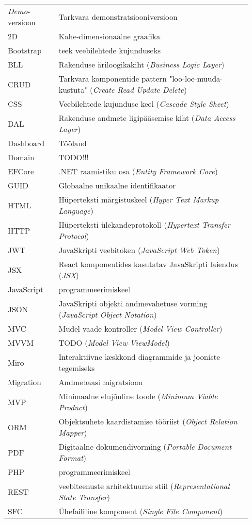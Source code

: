 \begin{longtable}{p{3cm}p{10cm}}
\textit{Demo}-versioon&Tarkvara demonstratsiooniversioon\\
2D&Kahe-dimensionaalne graafika\\
Bootstrap&teek veebilehtede kujunduseks\\
BLL&Rakenduse äriloogikakiht (\emph{Business Logic Layer})\\
CRUD&Tarkvara komponentide pattern "loo-loe-muuda-kustuta" (\emph{Create-Read-Update-Delete})\\
CSS&Veebilehtede kujunduse keel (\emph{Cascade Style Sheet})\\
DAL&Rakenduse andmete ligipääsemise kiht (\emph{Data Access Layer})\\
Dashboard&Töölaud\\
Domain&TODO!!!\\
EFCore&.NET raamistiku osa (\emph{Entity Framework Core})\\
GUID&Globaalne unikaalne identifikaator\\
HTML&Hüperteksti märgistuskeel (\emph{Hyper Text Markup Language})\\
HTTP&Hüperteksti ülekandeprotokoll (\emph{Hypertext Transfer Protocol})\\
JWT&JavaSkripti veebitoken (\emph{JavaScript Web Token})\\
JSX&React komponentides kasutatav JavaSkripti laiendus (\emph{JSX})\\
JavaScript&programmeerimiskeel\\
JSON&JavaSkripti objekti andmevahetuse vorming (\emph{JavaScript Object Notation})\\
MVC&Mudel-vaade-kontroller (\emph{Model View Controller})\\
MVVM&TODO (\emph{Model-View-ViewModel})\\
Miro&Interaktiivne keskkond diagrammide ja jooniste tegemiseks\\
Migration&Andmebaasi migratsioon \\
MVP&Minimaalne elujõuline toode (\emph{Minimum Viable Product})\\
ORM&Objektsuhete kaardistamise tööriist (\emph{Object Relation Mapper})\\
PDF&Digitaalne dokumendivorming (\emph{Portable Document Format})\\
PHP&programmeerimiskeel\\
REST&veebiteenuste arhitektuurne stiil (\emph{Representational State Transfer})\\
SFC&Ühefaililine komponent (\emph{Single File Component})\\

\end{longtable}
